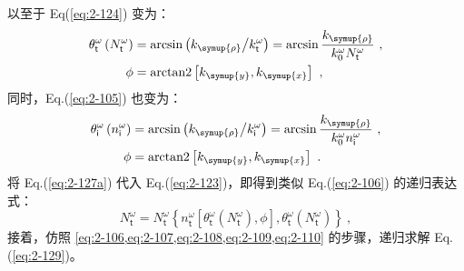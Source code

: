 以至于 Eq(\ref{eq:2-124}) 变为：
\begin{subequations} \label{eq:2-127}
\abovedisplayskip=8pt
\belowdisplayskip=10pt
\begin{align}
	\theta^{\omega}_{\mathsf{t}} \left( N^{\omega}_{\mathsf{t}} \right) &= \arcsin \left( k_{\symup{\rho}} \big/ k^{\omega}_{\mathsf{t}} \right) = \arcsin \frac{ k_{\symup{\rho}} }{ k^{\omega}_{0} N^{\omega}_{\mathsf{t}} } \label{eq:2-127a}~,\\ \phi &= \text{arctan2} \left[k_{\symup{y}}, k_{\symup{x}}\right] \label{eq:2-127b} ~,
\end{align}
\end{subequations}
同时，Eq.(\ref{eq:2-105}) 也变为：
\begin{subequations} \label{eq:2-128}
\abovedisplayskip=8pt
\belowdisplayskip=10pt
\begin{align}
	\theta^{\omega}_{\mathsf{i}} \left( n^{\omega}_{\mathsf{i}} \right) &= \arcsin \left( k_{\symup{\rho}} \big/ k^{\omega}_{\mathsf{i}} \right) = \arcsin \frac{ k_{\symup{\rho}} }{ k^{\omega}_{0} n^{\omega}_{\mathsf{i}} } \label{eq:2-128a}~,\\ \phi &= \text{arctan2} \left[k_{\symup{y}}, k_{\symup{x}}\right] \label{eq:2-128b}~.
\end{align}
\end{subequations}
将 Eq.(\ref{eq:2-127a}) 代入 Eq.(\ref{eq:2-123})，即得到类似 Eq.(\ref{eq:2-106}) 的递归表达式：
\begin{equation} \label{eq:2-129}
	N^{\omega}_{\mathsf{t}} = N^{\omega}_{\mathsf{t}} \left\{ n^{\omega}_{\mathsf{t}} \left[ \theta^{\omega}_{\mathsf{t}} \left( N^{\omega}_{\mathsf{t}} \right), \phi \right], \theta^{\omega}_{\mathsf{t}} \left( N^{\omega}_{\mathsf{t}} \right) \right\} ~,
\end{equation}
接着，仿照 \cref{eq:2-106,eq:2-107,eq:2-108,eq:2-109,eq:2-110} 的步骤，递归求解 Eq.(\ref{eq:2-129})。

